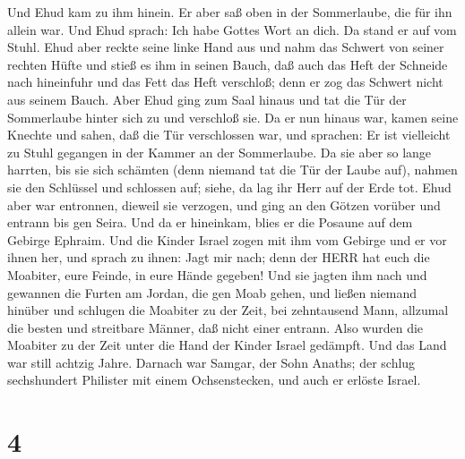  Und Ehud kam zu ihm hinein. Er aber saß oben in der
Sommerlaube, die für ihn allein war. Und Ehud sprach: Ich habe Gottes
Wort an dich. Da stand er auf vom Stuhl.  Ehud aber reckte
seine linke Hand aus und nahm das Schwert von seiner rechten Hüfte und
stieß es ihm in seinen Bauch,  daß auch das Heft der
Schneide nach hineinfuhr und das Fett das Heft verschloß; denn er zog
das Schwert nicht aus seinem Bauch.  Aber Ehud ging zum
Saal hinaus und tat die Tür der Sommerlaube hinter sich zu und verschloß
sie.  Da er nun hinaus war, kamen seine Knechte und sahen,
daß die Tür verschlossen war, und sprachen: Er ist vielleicht zu Stuhl
gegangen in der Kammer an der Sommerlaube.  Da sie aber so
lange harrten, bis sie sich schämten (denn niemand tat die Tür der Laube
auf), nahmen sie den Schlüssel und schlossen auf; siehe, da lag ihr Herr
auf der Erde tot.  Ehud aber war entronnen, dieweil sie
verzogen, und ging an den Götzen vorüber und entrann bis gen Seira.
 Und da er hineinkam, blies er die Posaune auf dem Gebirge
Ephraim. Und die Kinder Israel zogen mit ihm vom Gebirge und er vor
ihnen her,  und sprach zu ihnen: Jagt mir nach; denn der
HERR hat euch die Moabiter, eure Feinde, in eure Hände gegeben! Und sie
jagten ihm nach und gewannen die Furten am Jordan, die gen Moab gehen,
und ließen niemand hinüber  und schlugen die Moabiter zu
der Zeit, bei zehntausend Mann, allzumal die besten und streitbare
Männer, daß nicht einer entrann.  Also wurden die Moabiter
zu der Zeit unter die Hand der Kinder Israel gedämpft. Und das Land war
still achtzig Jahre.  Darnach war Samgar, der Sohn Anaths;
der schlug sechshundert Philister mit einem Ochsenstecken, und auch er
erlöste Israel.

\hypertarget{section-3}{%
\section{4}\label{section-3}}

